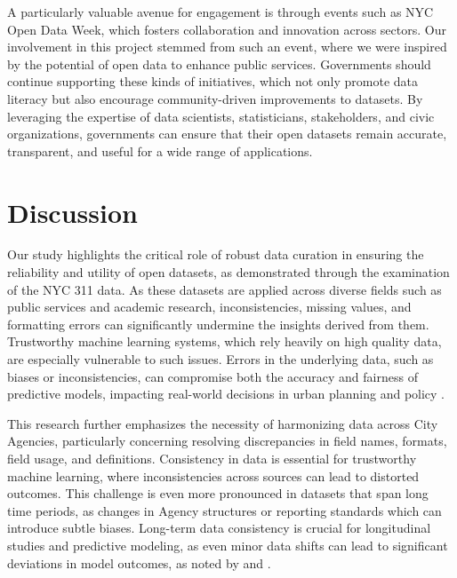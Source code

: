 \documentclass[linenumber]{jdsart}
\begin{document}
A particularly valuable avenue for engagement is through events such as NYC 
Open Data Week, which fosters collaboration and innovation across sectors. 
Our involvement in this project stemmed from such an event, where we were 
inspired by the potential of open data to enhance public services. Governments 
should continue supporting these kinds of initiatives, which not only promote 
data literacy but also encourage community\mbox{-}driven improvements to datasets. 
By leveraging the expertise of data scientists, statisticians, stakeholders, 
and civic organizations, governments can ensure that their open datasets 
remain accurate, transparent, and useful for a wide range of applications.


\section{Discussion} 
\label{sec:discussion}
Our study highlights the critical role of robust data curation in
ensuring the reliability and utility of open datasets, as demonstrated
through the examination of the NYC 311 data. As these datasets are
applied across diverse fields such as public services and academic
research, inconsistencies, missing values, and formatting errors can
significantly undermine the insights derived from them. Trustworthy
machine learning systems, which rely heavily on high quality data, are
especially vulnerable to such issues. Errors in the underlying data,
such as biases or inconsistencies, can compromise both the accuracy
and fairness of predictive models, impacting real\mbox{-}world decisions in
urban planning and policy \citep{rahm2000data, geiger2020garbage}.


This research further emphasizes the necessity of harmonizing data
across City Agencies, particularly concerning resolving discrepancies in field
names, formats, field usage, and definitions. Consistency in data is essential for
trustworthy machine learning, where inconsistencies across sources can
lead to distorted outcomes. This challenge is even more pronounced in
datasets that span long time periods, as changes in Agency structures
or reporting standards which can introduce subtle biases. Long\mbox{-}term data
consistency is crucial for longitudinal studies and predictive
modeling, as even minor data shifts can lead to significant deviations
in model outcomes, as noted by \citet{rahm2000data} and
\citet{borgman2012conundrum}.
\end{document}
